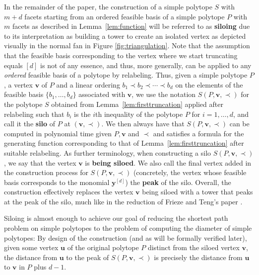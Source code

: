\documentclass[centering,11pt,reqno]{amsart}
\theoremstyle{definition}
\begin{document}
In the remainder of the paper, the construction of a simple polytope $S$ with $m+d$ facets starting from an ordered feasible basis of a simple polytope $P$ with $m$ facets as described in Lemma~\ref{lem:function} will be referred to as \textbf{siloing} due to its interpretation as building a tower to create an isolated vertex as depicted visually in the normal fan in Figure \ref{fig:triangulation}. Note that the assumption that the feasible basis corresponding to the vertex where we start truncating equals $[d]$ is not of any essence, and thus, more generally, can be applied to any \emph{ordered} feasible basis of a polytope by relabeling. Thus, given a simple polytope $P$, a vertex $\mathbf{v}$ of $P$ and a linear ordering $b_1\prec b_2\prec\cdots\prec b_d$ on the elements of the feasible basis $\{b_1,\ldots,b_d\}$ associated with $\mathbf{v}$, we use the notation $S(P,\mathbf{v},\prec)$ for the polytope $S$ obtained from Lemma~\ref{lem:firsttruncation} applied after relabeling such that $b_i$ is the $i$th inequality of the polytope $P$ for $i=1,\ldots,d$, and call it the \textbf{silo} of $P$ at $(\mathbf{v},\prec)$. We then always have that $S(P,\mathbf{v},\prec)$ can be computed in polynomial time given $P, \mathbf{v}$ and $\prec$ and satisfies a formula for the generating function corresponding to that of Lemma~\ref{lem:firsttruncation} after suitable relabeling. As further terminology, when constructing a silo $S(P,\mathbf{v},\prec)$, we say that the vertex $\mathbf{v}$ is \textbf{being siloed}. We also call the final vertex added in the construction process for $S(P,\mathbf{v},\prec)$ (concretely, the vertex whose feasible basis corresponds to the monomial $\mathbf{y}^{[d]}$) the \textbf{peak} of the silo. Overall, the construction effectively replaces the vertex $\mathbf{v}$ being siloed with a tower that peaks at the peak of the silo, much like in the reduction of Frieze and Teng's paper \cite{FriezeTeng1994}. 

Siloing is almost enough to achieve our goal of reducing the shortest path problem on simple polytopes to the problem of computing the diameter of simple polytopes: By design of the construction (and as will be formally verified later), given some vertex $\mathbf{u}$ of the original polytope $P$ distinct from the siloed vertex $\mathbf{v}$, the distance from $\mathbf{u}$ to the peak of $S(P,\mathbf{v},\prec)$ is precisely the distance from $\mathbf{u}$ to $\mathbf{v}$ in $P$ plus $d-1$. 
\end{document}
